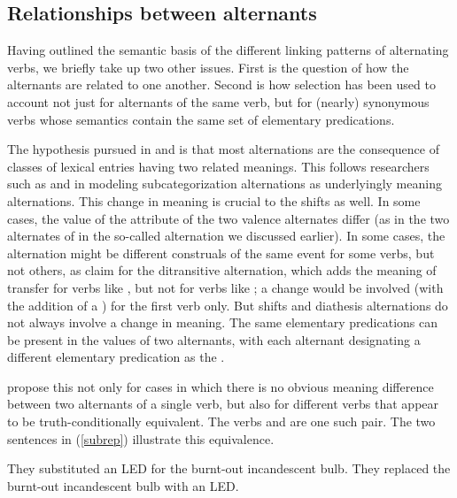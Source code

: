 \documentclass[output=paper,biblatex,babelshorthands,newtxmath,draftmode,colorlinks, citecolor=brown]{langscibook}
\begin{document}
\subsection{Relationships between alternants}

Having outlined the semantic basis of the different linking patterns of alternating verbs, we briefly take up two other issues.
First is the question of how the alternants are related to one another.
Second is how  selection has been used to account not just for alternants of the same verb, but for (nearly) synonymous verbs whose semantics contain the same set of elementary predications.

The hypothesis pursued in \citet{Davis1996} and \citet{Davis2001}  is that 
most alternations are the consequence of classes of lexical entries having
two related meanings. This follows researchers such as \citet{Pinker1989} and \citet{Levin1993} in modeling subcategorization alternations as underlyingly meaning alternations. 
This change in meaning is crucial to the \citet{KoenigandDavis2006}  shifts as well. In some cases, the value of the \rels attribute of the two valence alternates differ (as in the two alternates of  in the so-called  alternation we discussed earlier).
In some cases, the alternation might be different construals of the same event for some verbs, but not others, as \citet{RappaportandLevin2008} claim for the  ditransitive alternation, which adds the meaning of transfer for verbs like , but not for verbs like ; a  change would be involved (with the addition of a ) for the first verb only. But  shifts and diathesis alternations do not always involve a change in meaning. The same elementary predications can be present in the  values of two alternants, with each alternant designating a different elementary predication as the .

\citeauthor{KoenigandDavis2006} propose this not only for cases in which there is no obvious meaning difference between two alternants of a single verb, but also for different verbs that appear to be truth-conditionally equivalent.
The verbs  and  are one such pair.
The two sentences in (\ref{subrep}) illustrate this equivalence.

\begin{exe}
\ex\label{subrep}
\begin{xlist}
\ex\label{subrepa}They substituted an LED for the burnt-out incandescent bulb.
\ex\label{subrepb}They replaced the burnt-out incandescent bulb with an LED.
\end{xlist}
\end{exe}
\end{document}
